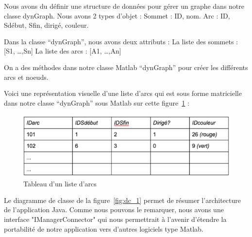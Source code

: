 \documentclass[pidr]{tnreport}
\begin{document}
Nous avons du définir une structure de données pour gérer un graphe dans notre classe dynGraph. Nous avons 2 types d’objet :
Sommet : ID, nom.
Arc : ID, Sdébut, Sfin, dirigé, couleur.

Dans la classe “dynGraph”, nous avons deux attributs :
La liste des sommets :  [S1, …,Sn]
La liste des arcs : [A1, …,An]

On a des méthodes dans notre classe Matlab “dynGraph” pour créer les différents arcs et noeuds.

Voici une représentation visuelle d’une liste d’arcs qui est sous forme matricielle dans notre classe “dynGraph” sous Matlab sur cette figure~\ref{fig:tableau_liste_arcs} : 

\begin{figure}[h]
  \centering
  \includegraphics[width=15cm]{figures/tableau_liste_arcs}
  \caption{Tableau d'un liste d'arcs}
  \label{fig:tableau_liste_arcs}
\end{figure}

Le diagramme de classe de la figure~\ref{fig:dc_1} permet de résumer l’architecture de l’application Java.
Comme nous pouvons le remarquer, nous avons une interface "IManagerConnector" qui nous permettrait à l'avenir d'étendre la portabilité de notre application vers d'autres logiciels type Matlab.
\end{document}
